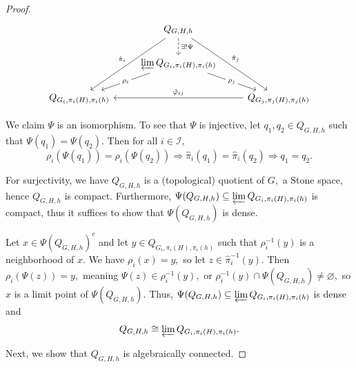 \documentclass[reqno,dvipsnames]{amsart}
\theoremstyle{definition}
\begin{document}
{\begin{proof}
\[\begin{tikzcd}
	& {Q_{G, H,h}} \\
	& {\varprojlim Q_{G_i, \pi_i(H),\pi_i(h)}} \\
	{Q_{G_i, \pi_i(H),\pi_i(h)}} && {Q_{G_j, \pi_j(H),\pi_j(h)}}
	\arrow["{\rho_j}"{description}, from=2-2, to=3-3]
	\arrow["{\rho_i}"{description}, from=2-2, to=3-1]
	\arrow["{\hat\varphi_{ij}}"', from=3-3, to=3-1]
	\arrow["{\hat\pi_j}", from=1-2, to=3-3]
	\arrow["{\hat\pi_i}"', from=1-2, to=3-1]
	\arrow["{\exists!\Psi}", dashed, from=1-2, to=2-2]
\end{tikzcd}\]

We claim $\Psi$ is an isomorphism. To see that $\Psi$ is injective, let $q_1,q_2 \in Q_{G,H,h}$ such that $\Psi(q_1) = \Psi(q_2).$ Then for all $i \in \mathcal{I},$
\[\rho_i(\Psi(q_1)) = \rho_i(\Psi(q_2)) \Rightarrow \hat\pi_i(q_1) = \hat\pi_i(q_2) \Rightarrow q_1 = q_2.\]

For surjectivity, we have $Q_{G,H,h}$ is a (topological) quotient of $G,$ a Stone space, hence $Q_{G,H,h}$ is compact. Furthermore, $\Psi(Q_{G,H,h}) \subseteq \varprojlim Q_{G_i, \pi_i(H),\pi_i(h)}$ is compact, thus it suffices to show that $\Psi(Q_{G,H,h})$ is dense.

Let $x \in \Psi(Q_{G,H,h})^c$ and let $y \in Q_{G_i, \pi_i(H),\pi_i(h)}$ such that $\rho_i^{-1}(y)$ is a neighborhood of $x$. We have $\rho_i(x) = y,$ so let $z \in \hat\pi_i^{-1}(y).$ Then $\rho_i(\Psi(z)) = y,$ meaning $\Psi(z) \in \rho_i^{-1}(y),$ or $\rho_i^{-1}(y) \cap \Psi(Q_{G,H,h}) \neq \varnothing,$ so $x$ is a limit point of $\Psi(Q_{G,H,h})$. Thus, $\Psi(Q_{G,H,h}) \subseteq \varprojlim Q_{G_i, \pi_i(H),\pi_i(h)}$ is dense and 
\[Q_{G,H,h} \cong \varprojlim Q_{G_i, \pi_i(H),\pi_i(h)}.\]

Next, we show that $Q_{G,H,h}$ is algebraically connected.
\end{proof}

}
\end{document}
